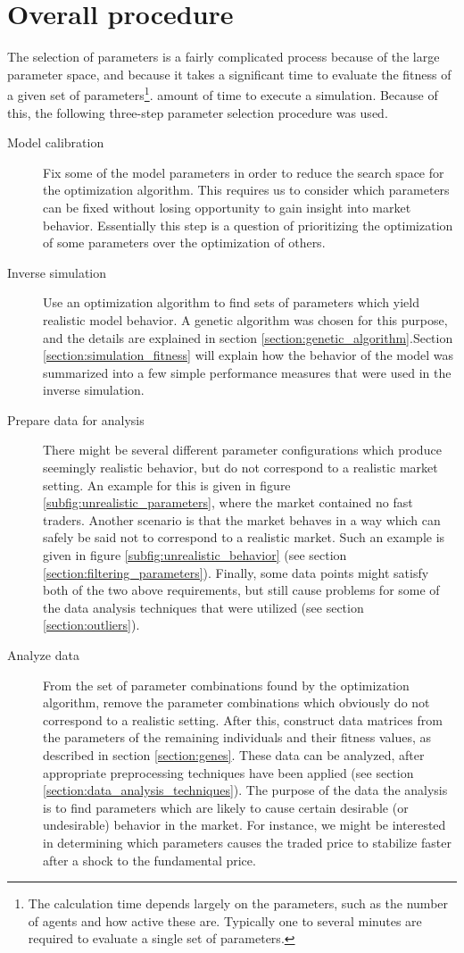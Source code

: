 \section{Overall procedure}\label{section:motivation_and_procedure}
The selection of parameters is a fairly complicated process because of the large parameter space, and because it takes a significant time to evaluate the fitness of a given set of parameters\footnote{The calculation time depends largely on the parameters, such as the number of agents and how active these are. Typically one to several minutes are required to evaluate a single set of parameters.}. amount of time to execute a simulation. Because of this, the following three-step parameter selection procedure was used.
\begin{description}
	\item [Model calibration]Fix some of the model parameters in order to reduce the search space for the optimization algorithm. This requires us to consider which parameters can be fixed without losing opportunity to gain insight into market behavior. Essentially this step is a question of prioritizing the optimization of some parameters over the optimization of others. 
	\item[Inverse simulation] Use an optimization algorithm to find sets of parameters which yield realistic model behavior. A genetic algorithm was chosen for this purpose, and the details are explained in section \ref{section:genetic_algorithm}.Section \ref{section:simulation_fitness} will explain how the behavior of the model was summarized into a few simple performance measures that were used in the inverse simulation.
	\item[Prepare data for analysis] There might be several different parameter configurations which produce seemingly realistic behavior, but do not correspond to a realistic market setting. An example for this is given in figure \ref{subfig:unrealistic_parameters}, where the market contained no fast traders. Another scenario is that the market behaves in a way which can safely be said not to correspond to a realistic market. Such an example is given in figure \ref{subfig:unrealistic_behavior} (see section \ref{section:filtering_parameters}). Finally, some data points might satisfy both of the two above requirements, but still cause problems for some of the data analysis techniques that were utilized (see section \ref{section:outliers}).
	\item[Analyze data] From the set of parameter combinations found by the optimization algorithm, remove the parameter combinations which obviously do not correspond to a realistic setting. After this, construct data matrices from the parameters of the remaining individuals and their fitness values, as described in section \ref{section:genes}. These data can be analyzed, after appropriate preprocessing techniques have been applied (see section \ref{section:data_analysis_techniques}). The purpose of the data the analysis is to find parameters which are likely to cause certain desirable (or undesirable) behavior in the market. For instance, we might be interested in determining which parameters causes the traded price to stabilize faster after a shock to the fundamental price. 
\end{description}
